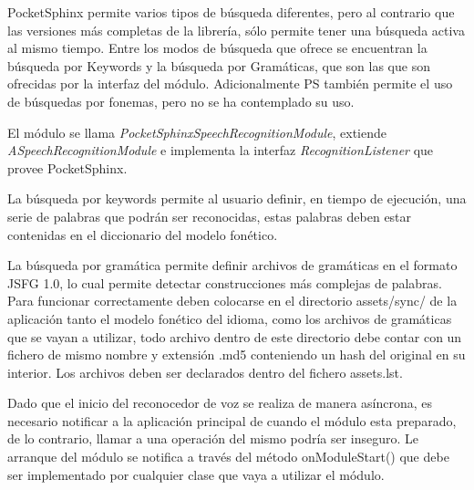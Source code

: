 PocketSphinx permite varios tipos de búsqueda diferentes, pero al contrario que las versiones más completas de la librería, sólo permite tener una búsqueda activa al mismo tiempo.
Entre los modos de búsqueda que ofrece se encuentran la búsqueda por Keywords y la búsqueda por Gramáticas, que son las que son ofrecidas por la interfaz del módulo. Adicionalmente PS también permite el uso de búsquedas por fonemas, pero no se ha contemplado su uso.

El módulo se llama  \textit{PocketSphinxSpeechRecognitionModule}, extiende \textit{ASpeechRecognitionModule} e implementa la interfaz \textit{RecognitionListener} que provee PocketSphinx.

La búsqueda por keywords permite al usuario definir, en tiempo de ejecución, una serie de palabras que podrán ser reconocidas, estas palabras deben estar contenidas en el diccionario del modelo fonético.

La búsqueda por gramática permite definir archivos de gramáticas en el formato  JSFG 1.0\cite{JSFGGrammar}, lo cual permite detectar construcciones más complejas de palabras.
Para funcionar correctamente deben colocarse en el directorio assets/sync/ de la aplicación tanto el modelo fonético del idioma, como los archivos de gramáticas que se vayan a utilizar, todo archivo dentro de este directorio debe contar con un fichero de mismo nombre y extensión .md5 conteniendo un hash del original en su interior. Los archivos deben ser declarados dentro del fichero assets.lst.

Dado que el inicio del reconocedor de voz se realiza de manera asíncrona, es necesario notificar a la aplicación principal de cuando el módulo esta preparado, de lo contrario, llamar a una operación del mismo podría ser inseguro. Le arranque del módulo se notifica a través del método onModuleStart() que debe ser implementado por cualquier clase que vaya a utilizar el  módulo.

